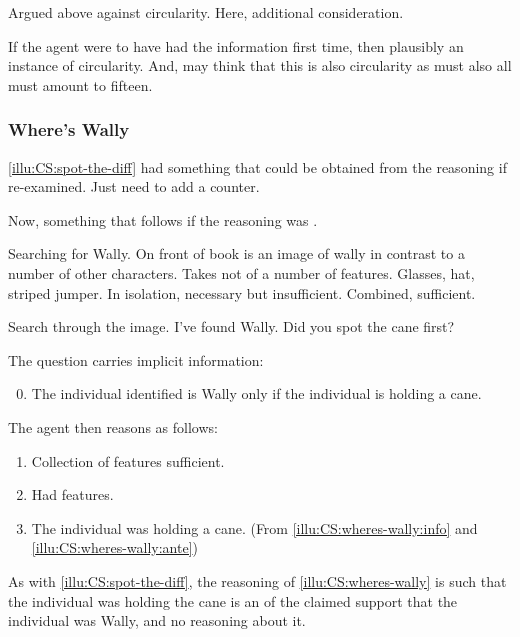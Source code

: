 \begin{note}
  Argued above against circularity.
  Here, additional consideration.

  If the agent were to have had the information first time, then plausibly an instance of circularity.
  And, may think that this is also circularity as must also all must amount to fifteen.
\end{note}

\subsubsection{Where's Wally}

\begin{note}
  \autoref{illu:CS:spot-the-diff} had something that could be obtained from the reasoning if re-examined.
  Just need to add a counter.

  Now, something that follows if the reasoning was \nmom{}.
\end{note}

\begin{note}
  \begin{illustration}
    \label{illu:CS:wheres-wally}
    Searching for Wally.
    On front of book is an image of wally in contrast to a number of other characters.
    Takes not of a number of features.
    Glasses, hat, striped jumper.
    In isolation, necessary but insufficient.
    Combined, sufficient.

    Search through the image.
    I've found Wally.
    Did you spot the cane first?

    The question carries implicit information:
    \begin{enumerate}[label=\arabic*., ref=(I\ref{illu:CS:wheres-wally}.\arabic*)]
      \setcounter{enumi}{-1}
    \item\label{illu:CS:wheres-wally:info} The individual identified is Wally only if the individual is holding a cane.
    \end{enumerate}

    The agent then reasons as follows:

    \begin{enumerate}[label=\arabic*., ref=(I\ref{illu:CS:wheres-wally}.\arabic*), resume]
    \item Collection of features sufficient.
    \item\label{illu:CS:wheres-wally:ante} Had features.
    \item The individual was holding a cane. \hfill (From \ref{illu:CS:wheres-wally:info} and \ref{illu:CS:wheres-wally:ante})
    \end{enumerate}
  \end{illustration}

  As with \autoref{illu:CS:spot-the-diff}, the reasoning of \autoref{illu:CS:wheres-wally} is such that the individual was holding the cane is an \requ{} of the claimed support that the individual was Wally, and no reasoning about it.
\end{note}


